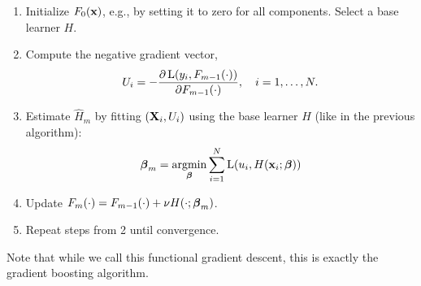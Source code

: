 \begin{enumerate}
    \item Initialize $F_0(\mathbf{x})$, e.g., by setting it to zero for all components. Select a base learner $H$.
    \item Compute the negative gradient vector,
        \begin{equation*}
            U_i=-\frac{\partial \operatorname{L}(y_i,F_{m-1}(\cdot))}{\partial F_{m-1}(\cdot)},\quad i=1,\dotsc,N.
        \end{equation*}
    \item Estimate $\hat{H}_m$ by fitting $(\mathbf{X}_i,U_i)$ using the base learner $H$ (like in the previous algorithm):
        \begin{equation*}
            \boldsymbol{\beta}_m=\operatorname*{argmin}_{\boldsymbol{\beta}}\sum_{i=1}^N\operatorname{L}(u_i,H(\mathbf{x}_i;\boldsymbol{\beta}))
        \end{equation*}
    \item Update $F_m(\cdot)=F_{m-1}(\cdot)+\nu H(\cdot;\boldsymbol{\beta}_m)$.
    \item Repeat steps from 2 until convergence.
\end{enumerate}
Note that while we call this functional gradient descent, this is exactly the gradient boosting algorithm.
